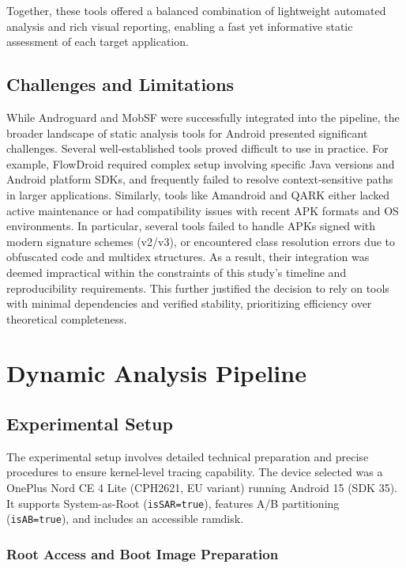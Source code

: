 \documentclass[a4paper,12pt]{report}
\begin{document}
Together, these tools offered a balanced combination of lightweight automated analysis and rich visual reporting, enabling a fast yet informative static assessment of each target application.


\subsection{Challenges and Limitations}

While Androguard and MobSF were successfully integrated into the pipeline, the broader landscape of static analysis tools for Android presented significant challenges. Several well-established tools proved difficult to use in practice. For example, FlowDroid required complex setup involving specific Java versions and Android platform SDKs, and frequently failed to resolve context-sensitive paths in larger applications. Similarly, tools like Amandroid and QARK either lacked active maintenance or had compatibility issues with recent APK formats and OS environments. In particular, several tools failed to handle APKs signed with modern signature schemes (v2/v3), or encountered class resolution errors due to obfuscated code and multidex structures. As a result, their integration was deemed impractical within the constraints of this study’s timeline and reproducibility requirements. This further justified the decision to rely on tools with minimal dependencies and verified stability, prioritizing efficiency over theoretical completeness.




\section{Dynamic Analysis Pipeline}
\subsection{Experimental Setup}

The experimental setup involves detailed technical preparation and precise procedures to ensure kernel-level tracing capability. The device selected was a OnePlus Nord CE 4 Lite (CPH2621, EU variant) running Android 15 (SDK 35). It supports System-as-Root (\texttt{isSAR=true}), features A/B partitioning (\texttt{isAB=true}), and includes an accessible ramdisk.

\subsubsection{Root Access and Boot Image Preparation}
\end{document}
